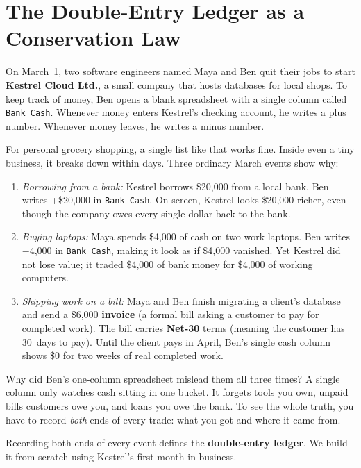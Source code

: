 \chapter{The Double-Entry Ledger as a Conservation Law}
\label{ch:double-entry}
\chapterline

On March~1, two software engineers named Maya and Ben quit their jobs to start \textbf{Kestrel Cloud Ltd.}, a small company that hosts databases for local shops. To keep track of money, Ben opens a blank spreadsheet with a single column called \texttt{Bank Cash}. Whenever money enters Kestrel's checking account, he writes a plus number. Whenever money leaves, he writes a minus number.

For personal grocery shopping, a single list like that works fine. Inside even a tiny business, it breaks down within days. Three ordinary March events show why:

\begin{enumerate}
  \item \emph{Borrowing from a bank:} Kestrel borrows \$20,000 from a local bank. Ben writes +\$20,000 in \texttt{Bank Cash}. On screen, Kestrel looks \$20,000 richer, even though the company owes every single dollar back to the bank.
  \item \emph{Buying laptops:} Maya spends \$4,000 of cash on two work laptops. Ben writes $-$4,000 in \texttt{Bank Cash}, making it look as if \$4,000 vanished. Yet Kestrel did not lose value; it traded \$4,000 of bank money for \$4,000 of working computers.
  \item \emph{Shipping work on a bill:} Maya and Ben finish migrating a client's database and send a \$6,000 \textbf{invoice} (a formal bill asking a customer to pay for completed work). The bill carries \textbf{Net-30} terms (meaning the customer has 30~days to pay). Until the client pays in April, Ben's single cash column shows \$0 for two weeks of real completed work.
\end{enumerate}

\begin{intuitionbox}
Why did Ben's one-column spreadsheet mislead them all three times? A single column only watches cash sitting in one bucket. It forgets tools you own, unpaid bills customers owe you, and loans you owe the bank. To see the whole truth, you have to record \emph{both} ends of every trade: what you got and where it came from.
\end{intuitionbox}

Recording both ends of every event defines the \textbf{double-entry ledger}. We build it from scratch using Kestrel's first month in business.

